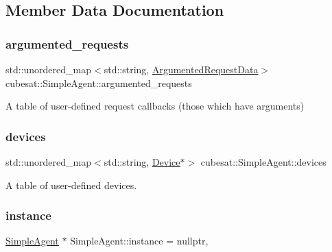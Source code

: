 \subsection{Member Data Documentation}
\mbox{\label{classcubesat_1_1SimpleAgent_abd859978c3143de453a17df044ab4f60}} 
\subsubsection{\texorpdfstring{argumented\+\_\+requests}{argumented\_requests}}
{\footnotesize\ttfamily std\+::unordered\+\_\+map$<$std\+::string, \hyperlink{structcubesat_1_1SimpleAgent_1_1ArgumentedRequestData}{Argumented\+Request\+Data}$>$ cubesat\+::\+Simple\+Agent\+::argumented\+\_\+requests\hspace{0.3cm}{\ttfamily [protected]}}



A table of user-\/defined request callbacks (those which have arguments) 

\mbox{\label{classcubesat_1_1SimpleAgent_abe6f03f56926b9159134172b9e031f09}} 
\subsubsection{\texorpdfstring{devices}{devices}}
{\footnotesize\ttfamily std\+::unordered\+\_\+map$<$std\+::string, \hyperlink{classcubesat_1_1Device}{Device}$\ast$$>$ cubesat\+::\+Simple\+Agent\+::devices\hspace{0.3cm}{\ttfamily [protected]}}



A table of user-\/defined devices. 

\mbox{\label{classcubesat_1_1SimpleAgent_afce483d51ae5166a7eafb5cedf5e384a}} 
\subsubsection{\texorpdfstring{instance}{instance}}
{\footnotesize\ttfamily \hyperlink{classcubesat_1_1SimpleAgent}{Simple\+Agent} $\ast$ Simple\+Agent\+::instance = nullptr\hspace{0.3cm}{\ttfamily [static]}, {\ttfamily [protected]}}



